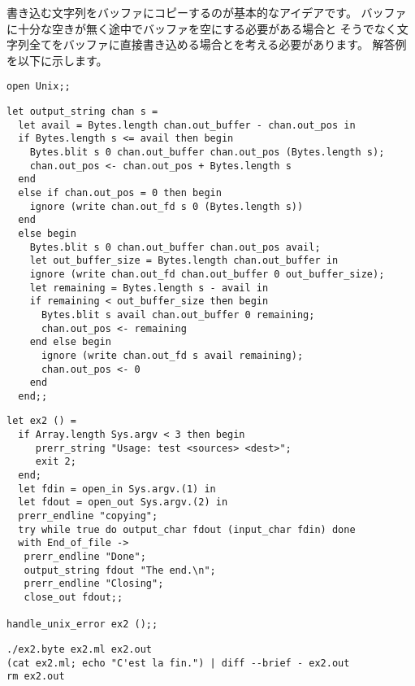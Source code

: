 \begin{answer}
書き込む文字列をバッファにコピーするのが基本的なアイデアです。
バッファに十分な空きが無く途中でバッファを空にする必要がある場合と
そうでなく文字列全てをバッファに直接書き込める場合とを考える必要があります。
解答例を以下に示します。
%
\begin{lstlisting}
open Unix;;
\end{lstlisting}
%
\begin{lstlisting}
let output_string chan s =
  let avail = Bytes.length chan.out_buffer - chan.out_pos in
  if Bytes.length s <= avail then begin
    Bytes.blit s 0 chan.out_buffer chan.out_pos (Bytes.length s);
    chan.out_pos <- chan.out_pos + Bytes.length s
  end
  else if chan.out_pos = 0 then begin
    ignore (write chan.out_fd s 0 (Bytes.length s))
  end
  else begin
    Bytes.blit s 0 chan.out_buffer chan.out_pos avail;
    let out_buffer_size = Bytes.length chan.out_buffer in
    ignore (write chan.out_fd chan.out_buffer 0 out_buffer_size);
    let remaining = Bytes.length s - avail in
    if remaining < out_buffer_size then begin
      Bytes.blit s avail chan.out_buffer 0 remaining;
      chan.out_pos <- remaining
    end else begin
      ignore (write chan.out_fd s avail remaining);
      chan.out_pos <- 0
    end
  end;;
\end{lstlisting}
%
\begin{lstlisting}
let ex2 () =
  if Array.length Sys.argv < 3 then begin
     prerr_string "Usage: test <sources> <dest>";
     exit 2;
  end;
  let fdin = open_in Sys.argv.(1) in
  let fdout = open_out Sys.argv.(2) in
  prerr_endline "copying";
  try while true do output_char fdout (input_char fdin) done
  with End_of_file ->
   prerr_endline "Done";
   output_string fdout "The end.\n";
   prerr_endline "Closing";
   close_out fdout;;

handle_unix_error ex2 ();;
\end{lstlisting}
%
\begin{lstlisting}
./ex2.byte ex2.ml ex2.out
(cat ex2.ml; echo "C'est la fin.") | diff --brief - ex2.out
rm ex2.out
\end{lstlisting}
\end{answer}


